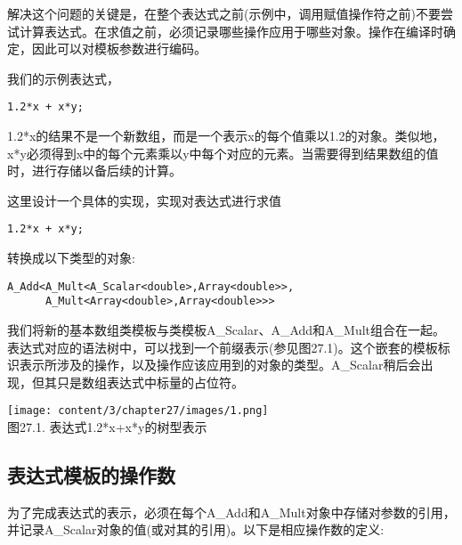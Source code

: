 
解决这个问题的关键是，在整个表达式之前(示例中，调用赋值操作符之前)不要尝试计算表达式。在求值之前，必须记录哪些操作应用于哪些对象。操作在编译时确定，因此可以对模板参数进行编码。

我们的示例表达式，

\begin{lstlisting}[style=styleCXX]
1.2*x + x*y;
\end{lstlisting}

1.2*x的结果不是一个新数组，而是一个表示x的每个值乘以1.2的对象。类似地，x*y必须得到x中的每个元素乘以y中每个对应的元素。当需要得到结果数组的值时，进行存储以备后续的计算。

这里设计一个具体的实现，实现对表达式进行求值

\begin{lstlisting}[style=styleCXX]
1.2*x + x*y;
\end{lstlisting}

转换成以下类型的对象:

\begin{lstlisting}[style=styleCXX]
A_Add<A_Mult<A_Scalar<double>,Array<double>>,
	  A_Mult<Array<double>,Array<double>>>
\end{lstlisting}

我们将新的基本数组类模板与类模板A\_Scalar、A\_Add和A\_Mult组合在一起。表达式对应的语法树中，可以找到一个前缀表示(参见图27.1)。这个嵌套的模板标识表示所涉及的操作，以及操作应该应用到的对象的类型。A\_Scalar稍后会出现，但其只是数组表达式中标量的占位符。

\begin{center}
\texttt{[image: content/3/chapter27/images/1.png]} \\
图27.1. 表达式1.2*x+x*y的树型表示
\end{center}

\subsection{表达式模板的操作数}

为了完成表达式的表示，必须在每个A\_Add和A\_Mult对象中存储对参数的引用，并记录A\_Scalar对象的值(或对其的引用)。以下是相应操作数的定义:

